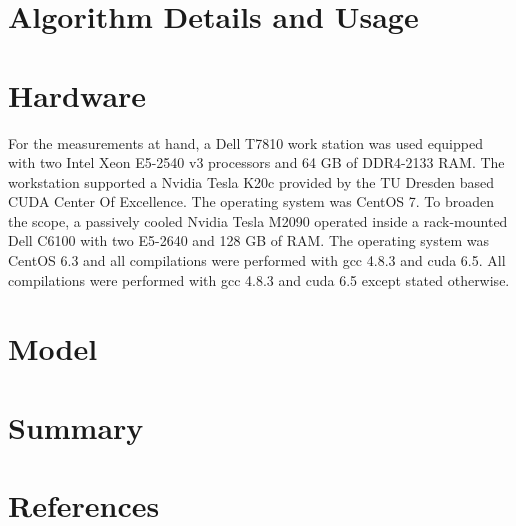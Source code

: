 \documentclass [12pt]{article}
\begin{document}
\section[sec:alg]{Algorithm Details and Usage}


\clearpage
\section[sec:hw]{Hardware}

For the measurements at hand, a Dell T7810 work station was used equipped with two Intel Xeon E5-2540 v3 processors and 64 GB of DDR4-2133 RAM. The workstation supported a Nvidia Tesla K20c provided by the TU Dresden based CUDA Center Of Excellence. The operating system was CentOS 7. To broaden the scope, a passively cooled Nvidia Tesla M2090 operated inside a rack-mounted Dell C6100 with two E5-2640 and 128 GB of RAM. The operating system was CentOS 6.3 and all compilations were performed with gcc 4.8.3 and cuda 6.5. All compilations were performed with gcc 4.8.3 and cuda 6.5 except stated otherwise.

\section[sec:models]{Model}



\section[sec:summ]{Summary}


\section{References}


\end{document}
